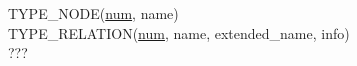 \documentclass[a4paper,11pt,french]{article}
\begin{document}
TYPE\_NODE(\underline{num}, name) \\



TYPE\_RELATION(\underline{num}, name, extended\_name, info) \\

???




\end{document}
